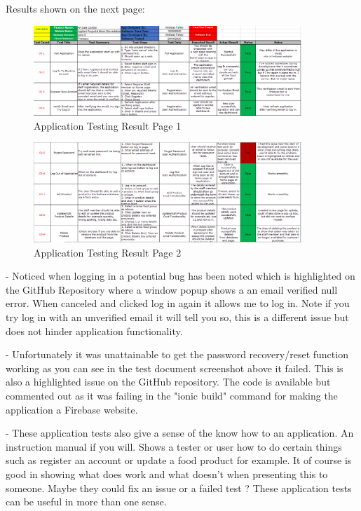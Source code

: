Results shown on the next page:
\newpage
\begin{figure}[h!]
	\caption{Application Testing Result Page 1}
	\label{image:test1}
	\centering
	\includegraphics[width=0.9\textwidth]{images/testResults1.PNG}
\end{figure}

\begin{figure}[h!]
	\caption{Application Testing Result Page 2}
	\label{image:test2}
	\centering
	\includegraphics[width=0.9\textwidth]{images/testResults2.PNG}
\end{figure}

- Noticed when logging in a potential bug has been noted which is highlighted on the GitHub Repository where a window popup shows a an email verified null error. When canceled and clicked log in again it allows me to log in. Note if you try log in with an unverified email it will tell you so, this is a different issue but does not hinder application functionality. 
\newline

- Unfortunately it was unattainable to get the password recovery/reset function working as you can see in the test document screenshot above it failed. This is also a highlighted issue on the GitHub repository. The code is available but commented out as it was failing in the "ionic build" command for making the application a Firebase website.
\newline

- These application tests also give a sense of the know how to an application. An instruction manual if you will. Shows a tester or user how to do certain things such as register an account or update a food product for example. It of course is good in showing what does work and what doesn't when presenting this to someone. Maybe they could fix an issue or a failed test ? These application tests can be useful in more than one sense.
\newpage
